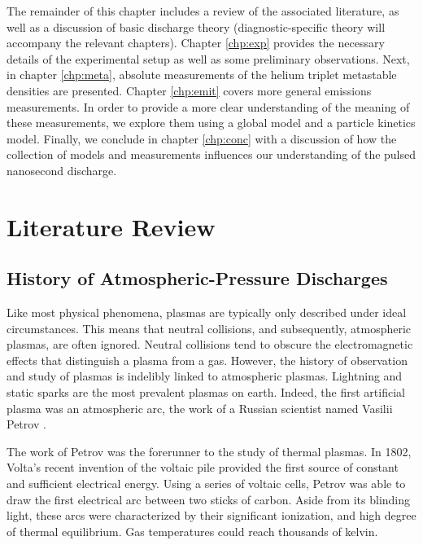 The remainder of this chapter includes a review of the associated literature, as
well as a discussion of basic discharge theory (diagnostic-specific theory will
accompany the relevant chapters). Chapter \ref{chp:exp} provides the necessary
details of the experimental setup as well as some preliminary observations.
Next, in chapter \ref{chp:meta}, absolute measurements of the helium triplet
metastable densities are presented. Chapter \ref{chp:emit} covers more general
emissions measurements. In order to provide a more clear understanding of the
meaning of these measurements, we explore them using a global model and a
particle kinetics model. Finally, we conclude in chapter \ref{chp:conc} with a
discussion of how the collection of models and measurements influences our
understanding of the pulsed nanosecond discharge.

\section{Literature Review}

\subsection{History of Atmospheric-Pressure Discharges}


Like most physical phenomena, plasmas are typically only described under ideal
circumstances. This means that neutral collisions, and subsequently, atmospheric
plasmas, are often ignored. Neutral collisions tend to obscure the
electromagnetic effects that distinguish a plasma from a gas. However, the
history of observation and study of plasmas is indelibly linked to atmospheric
plasmas. Lightning and static sparks are the most prevalent plasmas on earth.
Indeed, the first artificial plasma was an atmospheric arc, the work of a
Russian scientist named Vasilii Petrov .

The work of Petrov was the forerunner to the study of thermal plasmas. In 1802,
Volta's recent invention of the voltaic pile provided the first source of
constant and sufficient electrical energy. Using a series of voltaic cells,
Petrov was able to draw the first electrical arc between two sticks of carbon.
Aside from its blinding light, these arcs were characterized by their
significant ionization, and high degree of thermal equilibrium. Gas temperatures
could reach thousands of kelvin.

